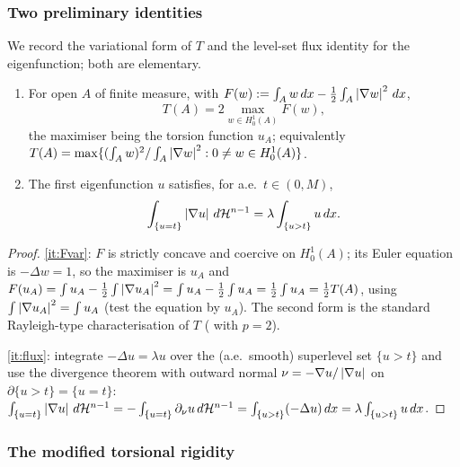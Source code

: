 \subsubsection*{Two preliminary identities}

We record the variational form of $T$ and the level-set flux identity for
the eigenfunction; both are elementary.

\begin{lemma}\label{lem:prelim}
\leavevmode
\begin{enumerate}[label=\textup{(\roman*)}]
\item\label{it:Fvar} For open $A$ of finite measure, with
$F(w):=\int_A w\,dx-\tfrac12\int_A\left|\nabla w\right|^2\,dx$,
\begin{equation}\label{eq:Tvar}
  T(A)=2\max_{w\in H^1_0(A)}F(w),
\end{equation}
the maximiser being the torsion function $u_A$; equivalently
$T(A)=\max\{(\int_A w)^2/\int_A\left|\nabla w\right|^2:0\ne w\in H^1_0(A)\}$.
\item\label{it:flux} The first eigenfunction $u$ satisfies, for a.e.\
$t\in(0,M)$,
\begin{equation}\label{eq:flux}
  \int_{\{u=t\}}\left|\nabla u\right|\,d\mathcal H^{n-1}=\lambda\int_{\{u>t\}}u\,dx .
\end{equation}
\end{enumerate}
\end{lemma}

\begin{proof}
\ref{it:Fvar}: $F$ is strictly concave and coercive on $H^1_0(A)$; its Euler
equation is $-\Delta w=1$, so the maximiser is $u_A$ and
$F(u_A)=\int u_A-\tfrac12\int\left|\nabla u_A\right|^2=\int u_A-\tfrac12\int u_A
=\tfrac12\int u_A=\tfrac12 T(A)$, using $\int\left|\nabla u_A\right|^2=\int u_A$
(test the equation by $u_A$). The second form is the standard Rayleigh-type
characterisation of $T$ (\cite[Prop.~2.2]{Brasco2014} with $p=2$).

\ref{it:flux}: integrate $-\Delta u=\lambda u$ over the
(a.e.\ smooth) superlevel set $\{u>t\}$ and use the divergence theorem with
outward normal $\nu=-\nabla u/\left|\nabla u\right|$ on $\partial\{u>t\}=\{u=t\}$:
$\int_{\{u=t\}}\left|\nabla u\right|\,d\mathcal H^{n-1}=-\int_{\{u=t\}}\partial_\nu u\,d\mathcal H^{n-1}
=\int_{\{u>t\}}(-\Delta u)\,dx=\lambda\int_{\{u>t\}}u\,dx$.
\end{proof}

\subsubsection*{The modified torsional rigidity}

